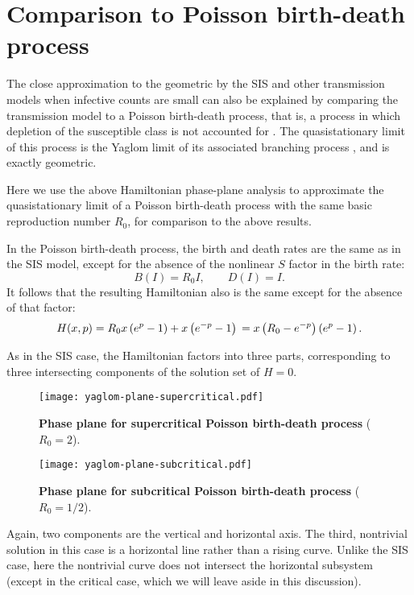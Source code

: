 \documentclass[review]{elsarticle}
\begin{document}

\appendix

\section{Comparison to Poisson birth-death process}

The close approximation to the geometric by the SIS and other
transmission models when infective counts are small
can also be explained by comparing the transmission model to
a Poisson birth-death process,
that is, a process in which depletion
of the susceptible class is not accounted for \cite{bailey1975}.
The quasistationary limit of this process is the Yaglom
limit of its associated branching process
\cite{yaglom1947certain,harris_theory_1963}, and is exactly geometric.

Here we use the above Hamiltonian phase-plane analysis to
approximate the quasistationary limit of
a Poisson birth-death process with the same basic reproduction number
$R_0$, for comparison to the above results.

In the Poisson birth-death process,
the birth and death rates are the same as in the SIS model,
except for the absence of the nonlinear $S$ factor in the birth
rate:
\[ B(I) = R_0 I, \qquad D(I) = I. \]
It follows that the resulting Hamiltonian also is the same except for
the absence of that factor:
\begin{dmath*}
 H(x,p) = R_0 x \left( e^p -1 \right) + x \left( e^{-p} - 1 \right) \\
   = x \left( R_0 - e^{-p} \right) \left( e^p - 1 \right).
\end{dmath*}

As in the SIS case, the Hamiltonian factors into three parts,
corresponding to three intersecting components of the solution set
of $H=0$.
\begin{figure}
\centering
\texttt{[image: yaglom-plane-supercritical.pdf]}
\caption{ \label{fig:yaglom-plane-supercritical}
{\bf Phase plane for supercritical Poisson birth-death process} ($R_0=2$).
}
\end{figure}
\begin{figure}
\centering
\texttt{[image: yaglom-plane-subcritical.pdf]}
\caption{ \label{fig:yaglom-plane-subcritical}
{\bf Phase plane for subcritical Poisson birth-death process} 
($R_0=1/2$).
}
\end{figure}
Again, two components are the vertical and horizontal axis.
The third, nontrivial solution
in this case is a horizontal line rather than a rising curve.
Unlike the SIS case, here the nontrivial curve does not intersect the
horizontal subsystem (except in the critical case, which we will leave
aside in this discussion).  
\end{document}
